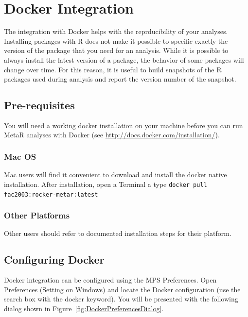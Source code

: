 

\chapter{Docker Integration}\label{chap:DockerIntegration}
The integration with Docker helps with the reprducibility of your analyses. Installing packages with R does not make it possible to specific exactly the version of the package that you need for an analysis. While it is possible to always install the latest version of a package, the behavior of some packages will change over time. For this reason, it is useful to build snapshots of the R packages used during analysis and report the version number of the snapshot. 

\section{Pre-requisites}
You will need a working docker installation on your machine before you can run MetaR analyses with Docker (see \url{http://docs.docker.com/installation/}).

\subsection{Mac OS}
Mac users will find it convenient to download and install the docker native installation. After installation, open a Terminal a type 
\texttt{docker pull fac2003:rocker-metar:latest} 

\subsection{Other Platforms}
Other users should refer to documented installation steps for their platform.

\section{Configuring Docker}
Docker integration can be configured using the MPS Preferences.  Open Preferences (Setting on Windows) and locate the Docker configuration (use the search box with the docker keyword). You will be presented with the following dialog shown in Figure~\ref{fig:DockerPreferencesDialog}.

